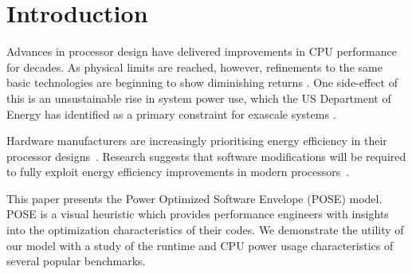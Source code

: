 \section{Introduction}
Advances in processor design have delivered improvements in CPU performance for decades. As physical limits are reached, however, refinements to the same basic technologies are beginning to show diminishing returns \cite{esmaeilzadeh:2011aa}. One side-effect of this is an unsustainable rise in system power use, which the US Department of Energy has identified as a primary constraint for exascale systems \cite{shalf:2011aa}.

Hardware manufacturers are increasingly prioritising energy efficiency in their processor designs~\cite{kurd:2014aa}. 
Research suggests that software modifications will be required to fully exploit energy efficiency improvements in modern processors~\cite{shao:2013aa}. 

This paper presents the Power Optimized Software Envelope (POSE) model.
POSE is a visual heuristic which provides performance engineers with insights into the optimization characteristics of their codes.
We demonstrate the utility of our model with a study of the runtime and CPU power usage characteristics of several popular benchmarks.
